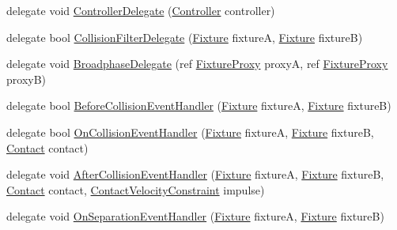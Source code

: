 \begin{DoxyCompactItemize}
\item 
delegate void \hyperlink{namespace_farseer_physics_1_1_dynamics_a3eb71c1aad910dfe002a3500cc678c0b}{Controller\+Delegate} (\hyperlink{class_farseer_physics_1_1_controllers_1_1_controller}{Controller} controller)
\item 
delegate bool \hyperlink{namespace_farseer_physics_1_1_dynamics_a0c43ff149e8b9f3224e7f5dd805281b2}{Collision\+Filter\+Delegate} (\hyperlink{class_farseer_physics_1_1_dynamics_1_1_fixture}{Fixture} fixture\+A, \hyperlink{class_farseer_physics_1_1_dynamics_1_1_fixture}{Fixture} fixture\+B)
\item 
delegate void \hyperlink{namespace_farseer_physics_1_1_dynamics_a18794aefafdc6a2a661ec21fc83951b9}{Broadphase\+Delegate} (ref \hyperlink{struct_farseer_physics_1_1_dynamics_1_1_fixture_proxy}{Fixture\+Proxy} proxy\+A, ref \hyperlink{struct_farseer_physics_1_1_dynamics_1_1_fixture_proxy}{Fixture\+Proxy} proxy\+B)
\item 
delegate bool \hyperlink{namespace_farseer_physics_1_1_dynamics_a14ac50ab47cb11796f6a624587b36cca}{Before\+Collision\+Event\+Handler} (\hyperlink{class_farseer_physics_1_1_dynamics_1_1_fixture}{Fixture} fixture\+A, \hyperlink{class_farseer_physics_1_1_dynamics_1_1_fixture}{Fixture} fixture\+B)
\item 
delegate bool \hyperlink{namespace_farseer_physics_1_1_dynamics_a7ec118e60eba61920ca0e4252b5b766d}{On\+Collision\+Event\+Handler} (\hyperlink{class_farseer_physics_1_1_dynamics_1_1_fixture}{Fixture} fixture\+A, \hyperlink{class_farseer_physics_1_1_dynamics_1_1_fixture}{Fixture} fixture\+B, \hyperlink{class_farseer_physics_1_1_dynamics_1_1_contacts_1_1_contact}{Contact} contact)
\item 
delegate void \hyperlink{namespace_farseer_physics_1_1_dynamics_a035ecfe770afb57ab9c71fa4f491201b}{After\+Collision\+Event\+Handler} (\hyperlink{class_farseer_physics_1_1_dynamics_1_1_fixture}{Fixture} fixture\+A, \hyperlink{class_farseer_physics_1_1_dynamics_1_1_fixture}{Fixture} fixture\+B, \hyperlink{class_farseer_physics_1_1_dynamics_1_1_contacts_1_1_contact}{Contact} contact, \hyperlink{class_farseer_physics_1_1_dynamics_1_1_contacts_1_1_contact_velocity_constraint}{Contact\+Velocity\+Constraint} impulse)
\item 
delegate void \hyperlink{namespace_farseer_physics_1_1_dynamics_ade34460148f9d799a829e85e0631fc69}{On\+Separation\+Event\+Handler} (\hyperlink{class_farseer_physics_1_1_dynamics_1_1_fixture}{Fixture} fixture\+A, \hyperlink{class_farseer_physics_1_1_dynamics_1_1_fixture}{Fixture} fixture\+B)
\end{DoxyCompactItemize}


